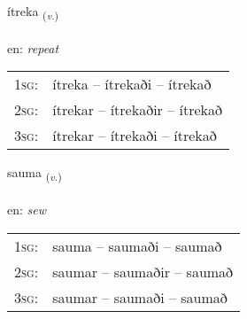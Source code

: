 \documentclass[frontgrid, backgrid]{flacards}\usepackage[]{graphicx}\usepackage[]{xcolor}
\begin{document}
\renewcommand{\flhead}{\vskip5pt \fboxsep=0pt {\small\bfseries\footnotesize Sagnorð | Verb}}
\renewcommand{\fcfoot}{\vskip5pt \fboxsep=0pt \hspace{2pt}{\small\bfseries\footnotesize 3K}}

\renewcommand{\blhead}{\vskip5pt {\small\bfseries\footnotesize Sagnorð | Verb }}
\renewcommand{\bcfoot}{\vskip5pt \hspace{2pt}{\small\bfseries\footnotesize 3K}}


{ítreka \small{\textsubscript{(\textit{v.})}} \\[1ex] %
\textphonetic{[iːtrɛka]} \\
en: \emph{repeat} \\  [2ex]
\renewcommand*{\arraystretch}{0.8}
\begin{tabular}{p{1cm}l}
\textsc{1sg}: & ítreka -- ítrekaði -- ítrekað \\ 
\textsc{2sg}: & ítrekar -- ítrekaðir -- ítrekað \\ 
\textsc{3sg}: & ítrekar -- ítrekaði -- ítrekað \\ 
\end{tabular}
}

\renewcommand{\flhead}{\vskip5pt \fboxsep=0pt {\small\bfseries\footnotesize Sagnorð | Verb}}
\renewcommand{\fcfoot}{\vskip5pt \fboxsep=0pt \hspace{2pt}{\small\bfseries\footnotesize 3K}}

\renewcommand{\blhead}{\vskip5pt {\small\bfseries\footnotesize Sagnorð | Verb }}
\renewcommand{\bcfoot}{\vskip5pt \hspace{2pt}{\small\bfseries\footnotesize 3K}}


{sauma \small{\textsubscript{(\textit{v.})}} \\[1ex] %
\textphonetic{[sœiːma]} \\
en: \emph{sew} \\  [2ex]
\renewcommand*{\arraystretch}{0.8}
\begin{tabular}{p{1cm}l}
\textsc{1sg}: & sauma -- saumaði -- saumað \\ 
\textsc{2sg}: & saumar -- saumaðir -- saumað \\ 
\textsc{3sg}: & saumar -- saumaði -- saumað \\ 
\end{tabular}
}
\end{document}
